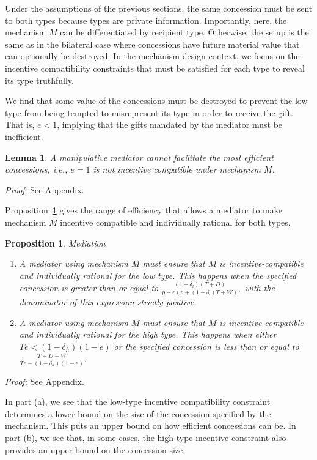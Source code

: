 \documentclass[bibtex,autowc]{apsr_submission}
\newcommand{\de}{\delta}
\newtheorem{proposition}{Proposition}
\newtheorem{lemma}{Lemma}
\begin{document}
Under the assumptions of the previous sections, the same concession must be sent to both types because types are private information. Importantly, here, the mechanism $M$ can be differentiated by recipient type. Otherwise, the setup is the same as in the bilateral case where concessions have future material value that can optionally be destroyed. In the mechanism design context, we focus on the incentive compatibility constraints that must be satisfied for each type to reveal its type truthfully.

We find that some value of the concessions must be destroyed to prevent the low type from being tempted to misrepresent its type in order to receive the gift. That is, $e<1$, implying that the gifts mandated by the mediator must be inefficient. 

\begin{lemma}
	A manipulative mediator cannot facilitate the most efficient concessions, i.e., $e=1$ is not incentive compatible under mechanism $M$. 
	\label{lemma:med}
\end{lemma}
\emph{Proof}: See Appendix.

Proposition~\ref{proposition:med} gives the range of efficiency that allows a mediator to make mechanism $M$ incentive compatible and individually rational for both types.

\begin{proposition}
\emph{Mediation}
\begin{enumerate}
		\item[(a)] A mediator using mechanism $M$ must ensure that $M$ is incentive-compatible and individually rational for the low type. This happens when the specified concession is greater than or equal to $\frac{\left(1 - \de_l \right)\left(T +D \right)}{p - e\left(p +(1-\de_l)T +W \right)},$ with the denominator of this expression strictly positive.
		\item[(b)] A mediator using mechanism $M$ must ensure that $M$ is incentive-compatible and individually rational for the high type. This happens when either $Te < (1-\de_h)(1-e)$ or the specified concession is less than or equal to $\frac{ T + D - W}{Te - (1-\de_h)(1-e)}$.
\end{enumerate}
	\label{proposition:med}
\end{proposition}
\emph{Proof:} See Appendix.

In part (a), we see that the low-type incentive compatibility constraint determines a lower bound on the size of the concession specified by the mechanism. This puts an upper bound on how efficient concessions can be. In part (b), we see that, in some cases, the high-type incentive constraint also provides an upper bound on the concession size.
\end{document}
